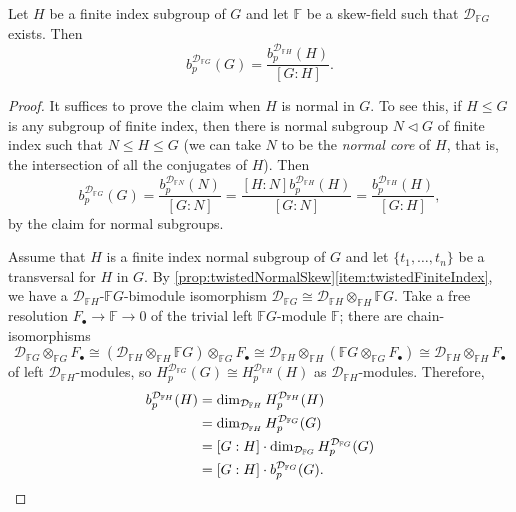 \documentclass[11pt, letterpaper]{amsart}
\begin{document}
\begin{lem}\label{lem:JBscales}
Let $H$ be a finite index subgroup of $G$ and let $\mathbb{F}$ be a skew-field such that $\mathcal{D}_{\mathbb{F}G}$ exists. Then 
\[
    b_p^{\mathcal{D}_{\mathbb{F}G}}(G) = \frac{b_p^{\mathcal{D}_{\mathbb{F}H}}(H)}{[G:H]}.
\]
\end{lem}
\begin{proof} It suffices to prove the claim when $H$ is normal in $G$. To see this, if $H \leqslant G$ is any subgroup of finite index, then there is normal subgroup $N \triangleleft G$ of finite index such that $N \leqslant H \leqslant G$ (we can take $N$ to be the \textit{normal core} of $H$, that is, the intersection of all the conjugates of $H$). Then
\[
b_p^{\mathcal{D}_{\mathbb{F}G}}(G) = \frac{b_p^{\mathcal{D}_{\mathbb{F}N}}(N)}{[G:N]} = \frac{[H:N] b_p^{\mathcal{D}_{\mathbb{F}H}}(H)}{[G:N]} = \frac{b_p^{\mathcal{D}_{\mathbb{F}H}}(H)}{[G:H]},
\]
by the claim for normal subgroups.

Assume that $H$ is a finite index normal subgroup of $G$ and let $\{t_1, \dots, t_n \}$ be a transversal for $H$ in $G$. By \cref{prop:twistedNormalSkew}\ref{item:twistedFiniteIndex}, we have a $\mathcal{D}_{\mathbb{F}H}$-$\mathbb{F}G$-bimodule isomorphism $\mathcal{D}_{\mathbb{F}G} \cong  \mathcal{D}_{\mathbb{F}H} \otimes_{\mathbb{F}H} \mathbb{F}G$. Take a free resolution $F_\bullet \longrightarrow \mathbb{F} \longrightarrow 0$ of the trivial left $\mathbb{F}G$-module $\mathbb{F}$; there are chain-isomorphisms
\[
    \mathcal{D}_{\mathbb{F}G} \otimes_{\mathbb{F}G} F_\bullet 
    \cong (\mathcal{D}_{\mathbb{F}H} \otimes_{\mathbb{F}H} \mathbb{F}G) \otimes_{\mathbb{F}G} F_\bullet  
    \cong \mathcal{D}_{\mathbb{F}H} \otimes_{\mathbb{F}H} (\mathbb{F}G \otimes_{\mathbb{F}G} F_\bullet) 
    \cong \mathcal{D}_{\mathbb{F}H} \otimes_{\mathbb{F}H} F_\bullet
\]
of left $\mathcal{D}_{\mathbb{F}H}$-modules, so $H_p^{\mathcal{D}_{\mathbb{F}G}}(G) \cong H_p^{\mathcal{D}_{\mathbb{F}H}}(H)$ as $\mathcal{D}_{\mathbb{F}H}$-modules. Therefore,
\begin{align*}
    b_p^{\mathcal{D}_{\mathbb{F}H}}(H) &= \dim_{\mathcal{D}_{\mathbb{F}H}} H_p^{\mathcal{D}_{\mathbb{F}H}}(H) \\
        &= \dim_{\mathcal{D}_{\mathbb{F}H}} H_p^{\mathcal{D}_{\mathbb{F}G}}(G) \\
        &= [G : H] \cdot \dim_{\mathcal{D}_{\mathbb{F}G}} H_p^{\mathcal{D}_{\mathbb{F}G}}(G) \\ 
        &= [G : H] \cdot b_p^{\mathcal{D}_{\mathbb{F}G}}(G). \qedhere
\end{align*}
\end{proof}
\end{document}
